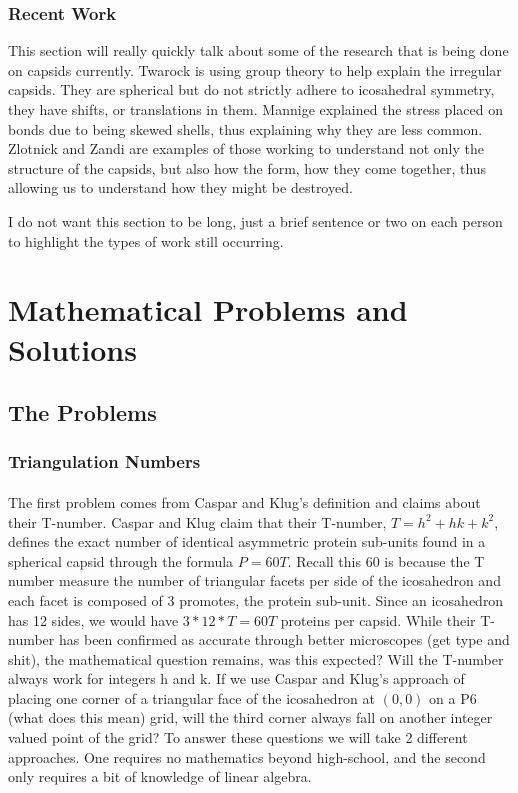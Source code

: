 \documentclass[12pt,letter]{article}
\begin{document}
\subsubsection{Recent Work}
This section will really quickly talk about some of the research that is being done on capsids currently. Twarock \cite{Twarock:2004} \cite{Twarock:2006} is using group theory to help explain the irregular capsids. They are spherical but do not strictly adhere to icosahedral symmetry, they have shifts, or translations in them. Mannige \cite{Mannige:2009} explained the stress placed on bonds due to being skewed shells, thus explaining why they are less common. Zlotnick \cite{Zlotnick:2005} and Zandi \cite{Zandi:2004} are examples of those working to understand not only the structure of the capsids, but also how the form, how they come together, thus allowing us to understand how they might be destroyed.

I do not want this section to be long, just a brief sentence or two on each person to highlight the types of work still occurring.

\section{Mathematical Problems and Solutions}
\subsection{The Problems}
\subsubsection{Triangulation Numbers}
\paragraph{}
The first problem comes from Caspar and Klug's definition and claims about their T-number. Caspar and Klug claim that their T-number, $T = h^2 + hk + k^2$, defines the exact number of identical asymmetric protein sub-units found in a spherical capsid through the formula $P = 60T$. Recall this 60 is because the T number measure the number of triangular facets per side of the icosahedron and each facet is composed of 3 promotes, the protein sub-unit. Since an icosahedron has 12 sides, we would have $3*12*T = 60T$ proteins per capsid. While their T-number has been confirmed as accurate through better microscopes (get type and shit), the mathematical question remains, was this expected? Will the T-number always work for integers h and k. If we use Caspar and Klug's approach of placing one corner of a triangular face of the icosahedron at $(0,0)$ on a P6 (what does this mean) grid, will the third corner always fall on another integer valued point of the grid? To answer these questions we will take 2 different approaches. One requires no mathematics beyond high-school, and the second only requires a bit of knowledge of linear algebra.
\end{document}
